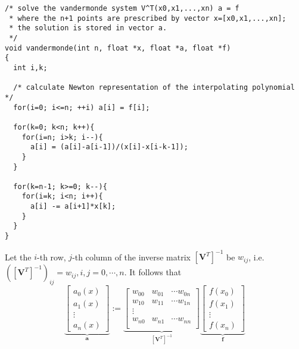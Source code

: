 \documentclass[a4paper,10pt]{article}
\begin{document}
\begin{verbatim}                                                                                    
/* solve the vandermonde system V^T(x0,x1,...,xn) a = f
 * where the n+1 points are prescribed by vector x=[x0,x1,...,xn];
 * the solution is stored in vector a.
 */
void vandermonde(int n, float *x, float *a, float *f)
{
  int i,k;

  /* calculate Newton representation of the interpolating polynomial */
  for(i=0; i<=n; ++i) a[i] = f[i];

  for(k=0; k<n; k++){
    for(i=n; i>k; i--){
      a[i] = (a[i]-a[i-1])/(x[i]-x[i-k-1]);
    }
  }

  for(k=n-1; k>=0; k--){
    for(i=k; i<n; i++){
      a[i] -= a[i+1]*x[k];
    }
  }
}
\end{verbatim}

Let the $i$-th row, $j$-th column of the inverse matrix $[\mathbf{V}^T]^{-1}$ be $w_{ij}$, i.e. $([\mathbf{V}^T]^{-1})_{ij}=w_{ij}, i,j=0,\cdots,n$. It follows that
\begin{equation}\label{eq:amatrix}
  \underbrace{  \begin{bmatrix}
      a_0(x)\\
      a_1(x)\\
      \vdots\\
      a_n(x)
  \end{bmatrix}}_{\mathbf{a}}:=\underbrace{\begin{bmatrix}
      w_{00} & w_{01} & \cdots w_{0n}\\
      w_{10} & w_{11} & \cdots w_{1n}\\
      \vdots\\
      w_{n0} & w_{n1} & \cdots w_{nn}\\
  \end{bmatrix}}_{[\mathbf{V}^T]^{-1}}\underbrace{\begin{bmatrix}
      f(x_0)\\
      f(x_1)\\
      \vdots\\
      f(x_n)
  \end{bmatrix}}_{\mathbf{f}}
\end{equation}
\end{document}
